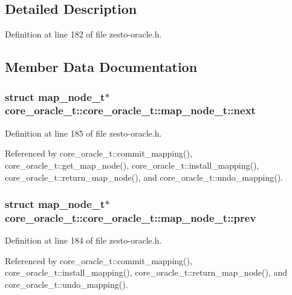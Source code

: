 \subsection{Detailed Description}


Definition at line 182 of file zesto-oracle.h.

\subsection{Member Data Documentation}
\subsubsection[{next}]{\setlength{\rightskip}{0pt plus 5cm}struct {\bf map\_\-node\_\-t}$\ast$ core\_\-oracle\_\-t::core\_\-oracle\_\-t::map\_\-node\_\-t::next\hspace{0.3cm}{\tt  [read]}}\label{structcore__oracle__t_1_1map__node__t_a8314e51205c7e6f7e74601eb21625f2}




Definition at line 185 of file zesto-oracle.h.

Referenced by core\_\-oracle\_\-t::commit\_\-mapping(), core\_\-oracle\_\-t::get\_\-map\_\-node(), core\_\-oracle\_\-t::install\_\-mapping(), core\_\-oracle\_\-t::return\_\-map\_\-node(), and core\_\-oracle\_\-t::undo\_\-mapping().
\subsubsection[{prev}]{\setlength{\rightskip}{0pt plus 5cm}struct {\bf map\_\-node\_\-t}$\ast$ core\_\-oracle\_\-t::core\_\-oracle\_\-t::map\_\-node\_\-t::prev\hspace{0.3cm}{\tt  [read]}}\label{structcore__oracle__t_1_1map__node__t_4f925fd747af3b8eaf5e252557e57a40}




Definition at line 184 of file zesto-oracle.h.

Referenced by core\_\-oracle\_\-t::commit\_\-mapping(), core\_\-oracle\_\-t::install\_\-mapping(), core\_\-oracle\_\-t::return\_\-map\_\-node(), and core\_\-oracle\_\-t::undo\_\-mapping().
